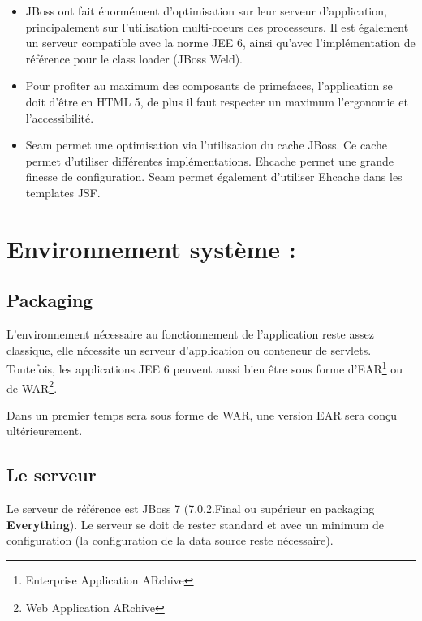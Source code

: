 \begin{itemize}
	\item {}
		JBoss ont fait énormément d'optimisation sur leur serveur d'application,  principalement
		sur l'utilisation multi-coeurs des processeurs. Il est également un serveur compatible avec la
		norme JEE 6, ainsi qu'avec l'implémentation de référence pour le class loader (JBoss Weld).
		\\

		
	\item {}
		Pour profiter au maximum des composants de primefaces, l'application se doit d'être en
		HTML 5, de plus il faut respecter un maximum l'ergonomie et l'accessibilité. 
		\\
						
	\item {}
		Seam permet une optimisation via l'utilisation du cache JBoss. Ce cache permet d'utiliser
		différentes implémentations. Ehcache permet une grande finesse de configuration. Seam
		permet également d'utiliser Ehcache dans les templates JSF.
\end{itemize}



\section{Environnement système :}

\subsection{Packaging}
L'environnement nécessaire au fonctionnement de l'application reste assez classique, 
elle nécessite un serveur d'application ou conteneur de servlets. Toutefois, les applications
JEE 6 peuvent aussi bien être sous forme d'EAR\footnote{Enterprise Application ARchive}   ou de 
WAR\footnote{Web Application ARchive}.

Dans un premier temps \youTestIt{} sera sous forme de WAR, une version EAR sera conçu ultérieurement.


\subsection{Le serveur}
Le serveur de référence est JBoss 7 (7.0.2.Final ou supérieur en packaging \textbf{Everything}). 
Le serveur se doit de rester standard et avec un minimum de configuration (la configuration de la data
source reste nécessaire).

